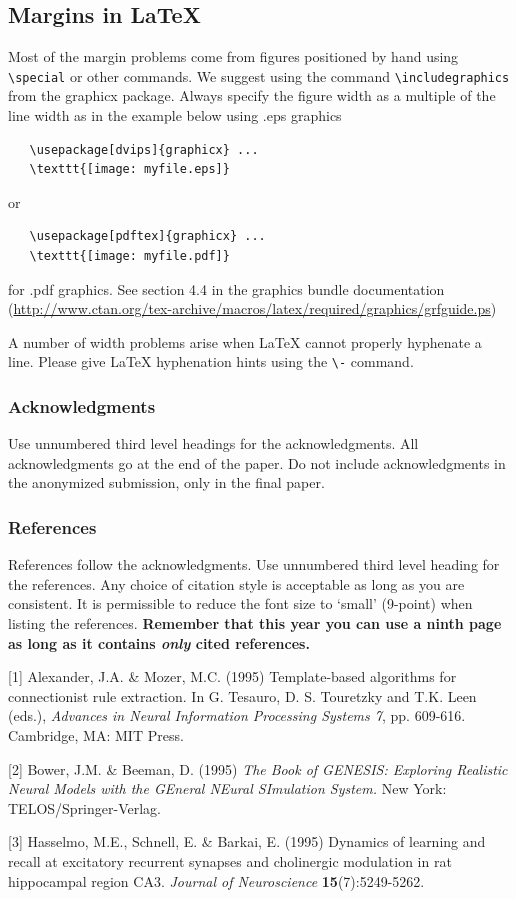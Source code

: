 \documentclass{article} %
\begin{document}
\subsection{Margins in LaTeX}
 
Most of the margin problems come from figures positioned by hand using
\verb+\special+ or other commands. We suggest using the command
\verb+\includegraphics+
from the graphicx package. Always specify the figure width as a multiple of
the line width as in the example below using .eps graphics
\begin{verbatim}
   \usepackage[dvips]{graphicx} ... 
   \texttt{[image: myfile.eps]} 
\end{verbatim}
or %
\begin{verbatim}
   \usepackage[pdftex]{graphicx} ... 
   \texttt{[image: myfile.pdf]} 
\end{verbatim}
for .pdf graphics. 
See section 4.4 in the graphics bundle documentation (\url{http://www.ctan.org/tex-archive/macros/latex/required/graphics/grfguide.ps}) 
 
A number of width problems arise when LaTeX cannot properly hyphenate a
line. Please give LaTeX hyphenation hints using the \verb+\-+ command.


\subsubsection*{Acknowledgments}

Use unnumbered third level headings for the acknowledgments. All
acknowledgments go at the end of the paper. Do not include 
acknowledgments in the anonymized submission, only in the 
final paper. 

\subsubsection*{References}

References follow the acknowledgments. Use unnumbered third level heading for
the references. Any choice of citation style is acceptable as long as you are
consistent. It is permissible to reduce the font size to `small' (9-point) 
when listing the references. {\bf Remember that this year you can use
a ninth page as long as it contains \emph{only} cited references.}

\small{
[1] Alexander, J.A. \& Mozer, M.C. (1995) Template-based algorithms
for connectionist rule extraction. In G. Tesauro, D. S. Touretzky
and T.K. Leen (eds.), {\it Advances in Neural Information Processing
Systems 7}, pp. 609-616. Cambridge, MA: MIT Press.

[2] Bower, J.M. \& Beeman, D. (1995) {\it The Book of GENESIS: Exploring
Realistic Neural Models with the GEneral NEural SImulation System.}
New York: TELOS/Springer-Verlag.

[3] Hasselmo, M.E., Schnell, E. \& Barkai, E. (1995) Dynamics of learning
and recall at excitatory recurrent synapses and cholinergic modulation
in rat hippocampal region CA3. {\it Journal of Neuroscience}
{\bf 15}(7):5249-5262.
}
\end{document}
